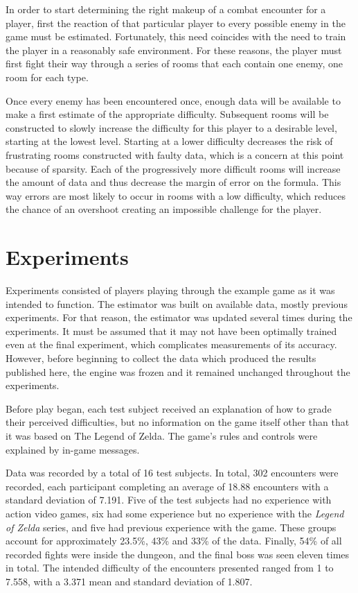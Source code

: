 \documentclass[a4paper]{article}
\begin{document}
\begin{multicols*}{2}
In order to start determining the right makeup of a combat encounter for a player, first the reaction of that particular player to every possible enemy in the game must be estimated. Fortunately, this need coincides with the need to train the player in a reasonably safe environment. For these reasons, the player must first fight their way through a series of rooms that each contain one enemy, one room for each type. 

Once every enemy has been encountered once, enough data will be available to make a first estimate of the appropriate difficulty. Subsequent rooms will be constructed to slowly increase the difficulty for this player to a desirable level, starting at the lowest level. Starting at a lower difficulty decreases the risk of frustrating rooms constructed with faulty data, which is a concern at this point because of sparsity. Each of the progressively more difficult rooms will increase the amount of data and thus decrease the margin of error on the formula. This way errors are most likely to occur in rooms with a low difficulty, which reduces the chance of an overshoot creating an impossible challenge for the player.

\section{Experiments}
Experiments consisted of players playing through the example game as it was intended to function. The estimator was built on available data, mostly previous experiments. For that reason, the estimator was updated several times during the experiments. It must be assumed that it may not have been optimally trained even at the final experiment, which complicates measurements of its accuracy. However, before beginning to collect the data which produced the results published here, the engine was frozen and it remained unchanged throughout the experiments.

Before play began, each test subject received an explanation of how to grade their perceived difficulties, but no information on the game itself other than that it was based on The Legend of Zelda. The game's rules and controls were explained by in-game messages.

Data was recorded by a total of 16 test subjects. In total, 302 encounters were recorded, each participant completing an average of 18.88 encounters with a standard deviation of 7.191. Five of the test subjects had no experience with action video games, six had some experience but no experience with the \emph{Legend of Zelda} series, and five had previous experience with the game. These groups account for approximately 23.5\%, 43\% and 33\% of the data. Finally, 54\% of all recorded fights were inside the dungeon, and the final boss was seen eleven times in total. The intended difficulty of the encounters presented ranged from 1 to 7.558, with a 3.371 mean and standard deviation of 1.807.


\end{multicols*}
\end{document}
